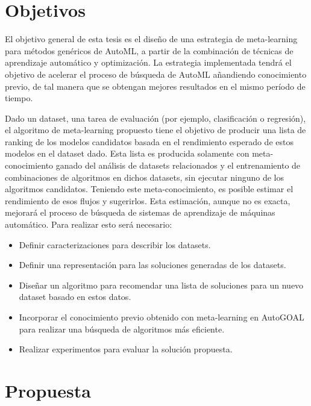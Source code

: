 \section*{Objetivos}

El objetivo general de esta tesis es el diseño de una estrategia de meta-learning para métodos genéricos de AutoML, a partir de la combinación de técnicas de aprendizaje automático y optimización. La estrategia implementada tendrá el objetivo de acelerar el proceso de búsqueda de AutoML añandiendo conocimiento previo, de tal manera que se obtengan mejores resultados en el mismo período de tiempo.

 Dado un dataset, una tarea de evaluación (por ejemplo, clasificación o regresión), el algoritmo de meta-learning propuesto tiene el objetivo de producir una lista de ranking de los modelos candidatos basada en el rendimiento esperado de estos modelos en el dataset dado. Esta lista es producida solamente con meta-conocimiento ganado del análisis de datasets relacionados y el entrenamiento de combinaciones de algoritmos en dichos datasets, sin ejecutar ninguno de los algoritmos candidatos. Teniendo este meta-conocimiento, es posible estimar el rendimiento de esos flujos y sugerirlos. Esta estimación, aunque no es exacta, mejorará el proceso de búsqueda de sistemas de aprendizaje de máquinas automático. Para realizar esto será necesario:
 

\begin{itemize}
	\item Definir caracterizaciones para describir los datasets.
	\item Definir una representación para las soluciones generadas de los datasets.
	\item Diseñar un algoritmo para recomendar una lista de soluciones para un nuevo dataset basado en estos datos.
	\item Incorporar el conocimiento previo obtenido con meta-learning en AutoGOAL para realizar una búsqueda de algoritmos más eficiente.
	\item Realizar experimentos para evaluar la solución propuesta.
\end{itemize}

\section*{Propuesta}

